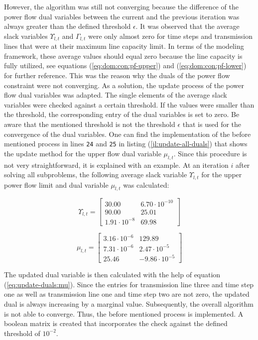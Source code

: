 However, the algorithm was still not converging because the difference of the power flow dual variables between the current and the previous iteration was always greater than the defined threshold $\epsilon$. It was observed that the average slack variables $\Upsilon_{l,t}$ and $\Gamma_{l,t}$ were only almost zero for time steps and transmission lines that were at their maximum line capacity limit. In terms of the modeling framework, these average values should equal zero because the line capacity is fully utilized, see equations (\ref{eq:dom:con:pf-upper}) and (\ref{eq:dom:con:pf-lower}) for further reference. This was the reason why the duals of the power flow constraint were not converging. As a solution, the update process of the power flow dual variables was adapted. The single elements of the average slack variables were checked against a certain threshold. If the values were smaller than the threshold, the corresponding entry of the dual variables is set to zero. Be aware that the mentioned threshold is not the threshold $\epsilon$ that is used for the convergence of the dual variables. One can find the implementation of the before mentioned process in lines \texttt{24} and \texttt{25} in listing (\ref{jl:update-all-duals}) that shows the update method for the upper flow dual variable $\mu_{l,t}$. Since this procedure is not very straightforward, it is explained with an example. At an iteration $i$ after solving all subproblems, the following average slack variable $\Upsilon_{l,t}$ for the upper power flow limit and dual variable $\mu_{l,t}$ was calculated:

\begin{equation}
	\Upsilon_{l,t} = \begin{bmatrix}
			30.00 & 6.70 \cdot 10^{-10} \\
			90.00 & 25.01 \\
			1.91 \cdot 10^{-8} & 69.98
		\end{bmatrix}
\end{equation}

\begin{equation}
	\mu_{l,t} = \begin{bmatrix}
			3.16 \cdot 10^{-6} & 129.89 \\
			7.31 \cdot 10^{-6} & 2.47 \cdot 10^{-5} \\
			25.46 & -9.86 \cdot 10^{-5}
		\end{bmatrix}
\end{equation}

The updated dual variable is then calculated with the help of equation (\ref{eq:update-duals:mu}). Since the entries for transmission line three and time step one as well as transmission line one and time step two are not zero, the updated dual is always increasing by a marginal value. Subsequently, the overall algorithm is not able to converge. Thus, the before mentioned process is implemented. A boolean matrix is created that incorporates the check against the defined threshold of $10^{-2}$.

